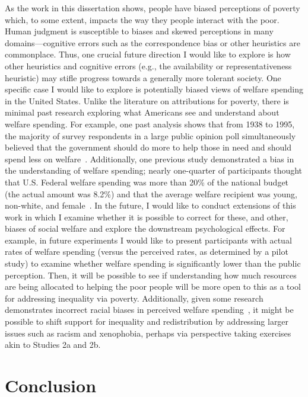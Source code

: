 \documentclass{sfuthesis}
\begin{document}
As the work in this dissertation shows, people have biased perceptions of poverty which, to some extent, impacts the way they people interact with the poor. Human judgment is susceptible to biases and skewed perceptions in many domains—cognitive errors such as the correspondence bias or other heuristics are commonplace. Thus, one crucial future direction I would like to explore is how other heuristics and cognitive errors (e.g., the availability or representativeness heuristic) may stifle progress towards a generally more tolerant society. One specific case I would like to explore is potentially biased views of welfare spending in the United States. Unlike the literature on attributions for poverty, there is minimal past research exploring what Americans see and understand about welfare spending. For example, one past analysis shows that from 1938 to 1995, the majority of survey respondents in a large public opinion poll simultaneously believed that the government should do more to help those in need and should spend less on welfare~\cite{macleod99}. Additionally, one previous study demonstrated a bias in the understanding of welfare spending; nearly one-quarter of participants thought that U.S. Federal welfare spending was more than 20\% of the national budget (the actual amount was 8.2\%) and that the average welfare recipient was young, non-white, and female~\cite{sotirovic01}. In the future, I would like to conduct extensions of this work in which I examine whether it is possible to correct for these, and other, biases of social welfare and explore the downstream psychological effects. For example, in future experiments I would like to present participants with actual rates of welfare spending (versus the perceived rates, as determined by a pilot study) to examine whether welfare spending is significantly lower than the public perception. Then, it will be possible to see if understanding how much resources are being allocated to helping the poor people will be more open to this as a tool for addressing inequality via poverty. Additionally, given some research demonstrates incorrect racial biases in perceived welfare spending~\cite{sotirovic01}, it might be possible to shift support for inequality and redistribution by addressing larger issues such as racism and xenophobia, perhaps via perspective taking exercises akin to Studies 2a and 2b. 

\section{Conclusion}
\end{document}
